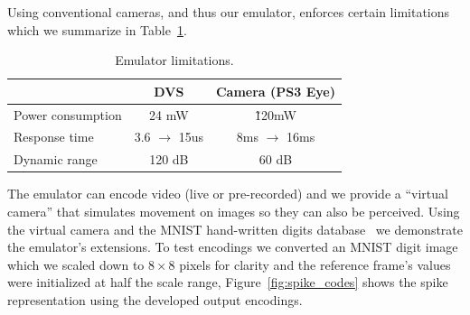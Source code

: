 \documentclass[conference]{IEEEtran}
\begin{document}
Using conventional cameras, and thus our emulator, enforces certain limitations which we summarize in Table~\ref{tb:constraints}.
\begin{table}
  \centering
  \caption{Emulator limitations.}
  \label{tb:constraints}
  \begin{tabular}{l c c}
    & DVS & Camera (PS3 Eye) \\ 
    \hline
    \rule{0pt}{0.4cm}Power consumption & 24 mW & \~120mW\\
    Response time & 3.6 $\rightarrow$ 15us & 8ms $\rightarrow$ 16ms \\
    Dynamic range & 120 dB & 60 dB\\
  \end{tabular}
\end{table}


The emulator can encode video (live or pre-recorded) and we provide a ``virtual camera'' that simulates movement on images so they can also be perceived. Using the virtual camera and the MNIST hand-written digits database~\cite{mnist,mnist:web} we demonstrate the emulator's extensions. To test encodings we converted an MNIST  digit image which we scaled down to $8\times8$ pixels for clarity and the reference frame's values were initialized at half the scale range, Figure~\ref{fig:spike_codes} shows the spike representation using the developed output encodings.
\end{document}
